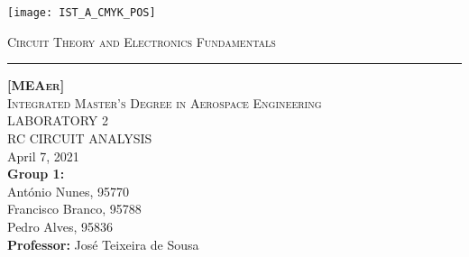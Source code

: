 \thispagestyle {empty}

\begin{titlepage}

\texttt{[image: IST\_A\_CMYK\_POS]} \\[1cm]

\centering

\textsc{\large{Circuit Theory and Electronics Fundamentals}} \\[0.25cm]
\hrule
\vspace{1.75cm}

\textsc{\textbf {[MEAer]}} \\[0.5cm]
\textsc{Integrated Master's Degree in Aerospace Engineering} \\[3.25cm]
\MakeUppercase{\Huge Laboratory 2} \\[0.75cm]
\MakeUppercase{\huge RC Circuit Analysis} \\[3.5cm]
April 7, 2021 \\[2.5cm]
\textbf{Group 1:} \\[0.5cm]
António Nunes, 95770 \\
Francisco Branco, 95788 \\
Pedro Alves, 95836 \\[2cm]
\textbf{Professor:} José Teixeira de Sousa 
\end{titlepage}


